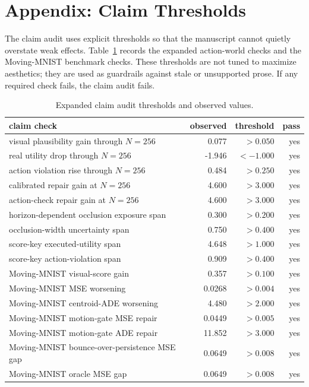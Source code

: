 \documentclass{article}
\begin{document}
\section{Appendix: Claim Thresholds}
\label{app:claim-thresholds}

The claim audit uses explicit thresholds so that the manuscript cannot quietly overstate weak effects. Table~\ref{tab:claim-thresholds} records the expanded action-world checks and the Moving-MNIST benchmark checks. These thresholds are not tuned to maximize aesthetics; they are used as guardrails against stale or unsupported prose. If any required check fails, the claim audit fails.

\begin{table}[tbp]
  \centering
  \small
  \caption{Expanded claim audit thresholds and observed values.}
  \label{tab:claim-thresholds}
  \begin{tabularx}{\linewidth}{@{}Xrrr@{}}
    \toprule
    claim check & observed & threshold & pass \\
    \midrule
    visual plausibility gain through \(N=256\) & 0.077 & \(>0.050\) & yes \\
    real utility drop through \(N=256\) & -1.946 & \(<-1.000\) & yes \\
    action violation rise through \(N=256\) & 0.484 & \(>0.250\) & yes \\
    calibrated repair gain at \(N=256\) & 4.600 & \(>3.000\) & yes \\
    action-check repair gain at \(N=256\) & 4.600 & \(>3.000\) & yes \\
    horizon-dependent occlusion exposure span & 0.300 & \(>0.200\) & yes \\
    occlusion-width uncertainty span & 0.750 & \(>0.400\) & yes \\
    score-key executed-utility span & 4.648 & \(>1.000\) & yes \\
    score-key action-violation span & 0.909 & \(>0.400\) & yes \\
    Moving-MNIST visual-score gain & 0.357 & \(>0.100\) & yes \\
    Moving-MNIST MSE worsening & 0.0268 & \(>0.004\) & yes \\
    Moving-MNIST centroid-ADE worsening & 4.480 & \(>2.000\) & yes \\
    Moving-MNIST motion-gate MSE repair & 0.0449 & \(>0.005\) & yes \\
    Moving-MNIST motion-gate ADE repair & 11.852 & \(>3.000\) & yes \\
    Moving-MNIST bounce-over-persistence MSE gap & 0.0649 & \(>0.008\) & yes \\
    Moving-MNIST oracle MSE gap & 0.0649 & \(>0.008\) & yes \\
    \bottomrule
  \end{tabularx}
\end{table}
\end{document}
